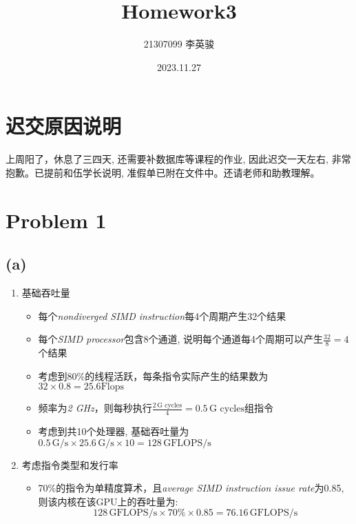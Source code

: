 \documentclass{article}
\title{Homework3}
\author{21307099 李英骏}
\date{2023.11.27}
\begin{document}
\maketitle

\section*{迟交原因说明}
上周阳了，休息了三四天, 还需要补数据库等课程的作业, 因此迟交一天左右, 非常抱歉。已提前和伍学长说明, 准假单已附在文件中。还请老师和助教理解。

\section*{Problem 1}
\subsection*{(a)}
\begin{enumerate}
    \item 基础吞吐量
          \begin{itemize}
              \item 每个\textit{nondiverged SIMD instruction}每4个周期产生32个结果
              \item 每个\textit{SIMD processor}包含8个通道, 说明每个通道每4个周期可以产生$\frac{32}{8} = 4$个结果
              \item 考虑到80\%的线程活跃，每条指令实际产生的结果数为$32 \times 0.8 = 25.6 \text{Flops}$
              \item 频率为\textit{2 GHz}，则每秒执行$\frac{2 \, \text{G cycles}}{4} = 0.5 \, \text{G cycles}$组指令
              \item 考虑到共10个处理器, 基础吞吐量为$0.5 \,\text{G/s} \times 25.6 \,\text{G/s} \times 10 = 128 \,\text{GFLOPS/s}$
          \end{itemize}

    \item 考虑指令类型和发行率
          \begin{itemize}
              \item 70\%的指令为单精度算术，且\textit{average SIMD instruction issue rate}为0.85, 则该内核在该GPU上的吞吐量为:
                    \[ 128 \,\text{GFLOPS/s} \times 70\% \times 0.85 = 76.16 \,\text{GFLOPS/s} \]
          \end{itemize}
\end{enumerate}
\end{document}
